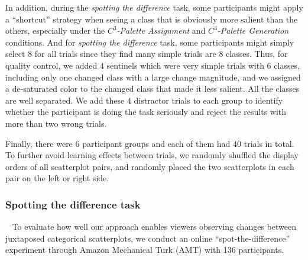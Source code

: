 In addition, during the \emph{spotting the difference} task, some participants might apply a ``shortcut'' strategy when seeing a class that is obviously more salient than the others, especially under the \emph{$C^3$-Palette Assignment} and \emph{$C^3$-Palette Generation} conditions.
And for \emph{spotting the difference} task, some participants might simply select 8 for all trials since they find many simple trials are 8 classes. 
Thus, for quality control, we added $4$ sentinels which were very simple trials with 6 classes, including only one changed class with a large change magnitude, and we assigned a de-saturated color to the changed class that made it less salient. All the classes are well separated. We add these 4 distractor trials to each group to identify whether the participant is doing the task seriously and reject the results with more than two wrong trials.

Finally, there were $6$ participant groups and each of them had $40$ trials in total. To further avoid learning effects between trials, we randomly shuffled the display orders of all scatterplot pairs, and randomly placed the two scatterplots in each pair on the left or right side.

\subsubsection{Spotting the difference task}
\
\newline
To evaluate how well our approach enables viewers observing changes between juxtaposed categorical scatterplots, we conduct an online ``spot-the-difference'' experiment through Amazon Mechanical Turk (AMT) with 136 participants.

